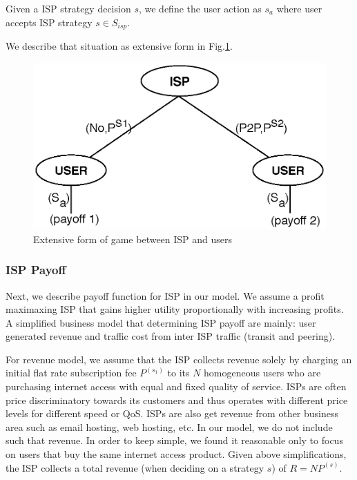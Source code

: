 \documentclass[paper]{ieice}
\begin{document}
\newtheorem{theorem2}{Definition}
\begin{theorem}
Given a ISP strategy decision $s$, we define the user action as $s_a$ where user accepts ISP strategy $s \in S_{isp}$.
\end{theorem}
We describe that situation as extensive form in Fig.\ref{fig:gametree}.



\begin{figure}[tb] 
\begin{center}
\includegraphics[scale=0.35]{graphs/game-tree.eps}
\end{center}
\caption{Extensive form of game between ISP and users}
\label{fig:gametree}
\vspace{-2mm}
\end{figure}

\subsubsection{ISP Payoff}
Next, we describe payoff function for ISP in our model.  
We assume a profit maximaxing ISP that gains higher utility proportionally with increasing profits. 
A simplified business model that determining ISP payoff are mainly: user generated revenue and traffic cost from inter ISP traffic (transit and peering).

For revenue model, we assume that the ISP collects revenue solely by charging an initial flat rate subscription fee $P^{(s_1)}$ to its $N$ homogeneous users who are purchasing internet access with equal and fixed quality of service.
ISPs are often price discriminatory towards its customers and thus operates with different price levels for different speed or QoS.
ISPs are also get revenue from other business area such as email hosting, web hosting, etc. 
In our model, we do not include such that revenue. 
In order to keep simple, we found it reasonable only to focus on users that buy the same internet access product. 
Given above simplifications, the ISP collects a total revenue (when deciding on a strategy $s$) of $R = N P^{(s)}$.
\end{document}
